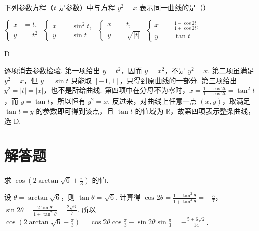 \begin{problem}
下列参数方程（\(t\) 是参数）中与方程 \(y^2=x\) 表示同一曲线的是（\quad）

\choices
    {\(\left\{\begin{aligned}x&=t,\\ y&=t^2\end{aligned}\right.\)}
    {\(\left\{\begin{aligned}x&=\sin^2 t,\\ y&=\sin t\end{aligned}\right.\)}
    {\(\left\{\begin{aligned}x&=t,\\ y&=\sqrt{|t|}\end{aligned}\right.\)}
    {\(\left\{\begin{aligned}x&=\frac{1-\cos 2t}{1+\cos 2t},\\ y&=\tan t\end{aligned}\right.\)}
\end{problem}

\begin{answer}
D
\end{answer}

\begin{solution}
逐项消去参数检验. 第一项给出 \(y=t^2\)，因而 \(y=x^2\)，不是 \(y^2=x\). 第二项虽满足 \(y^2=x\)，但 \(y=\sin t\) 只能取 \([-1,1]\)，只得到原曲线的一部分. 第三项给出 \(y^2=|t|=|x|\)，也不是所给曲线. 第四项中在分母不为零时，\(x=\frac{1-\cos2t}{1+\cos2t}=\tan^2t\)，而 \(y=\tan t\)，所以恒有 \(y^2=x\). 反过来，对曲线上任意一点 \((x,y)\)，取满足 \(\tan t=y\) 的参数即可得到该点，且 \(\tan t\) 的值域为 \(\mathbb R\)，故第四项表示整条曲线，选 D.
\end{solution}

\section{解答题}

\begin{problem}
求 \(\cos\left( 2\arctan\sqrt{6}+\frac{\pi}{3} \right)\) 的值.
\end{problem}

\begin{solution}
设 \(\theta=\arctan\sqrt{6}\)，则 \(\tan\theta=\sqrt{6}\). 计算得 \(\cos 2\theta=\frac{1-\tan^2\theta}{1+\tan^2\theta}=-\frac{5}{7}\)，\(\sin 2\theta=\frac{2\tan\theta}{1+\tan^2\theta}=\frac{2\sqrt{6}}{7}\). 所以 \(\cos\left( 2\arctan\sqrt{6}+\frac{\pi}{3} \right)=\cos 2\theta \cos \frac{\pi}{3}-\sin 2\theta \sin \frac{\pi}{3}=-\frac{5+6\sqrt{2}}{14}\).
\end{solution}

